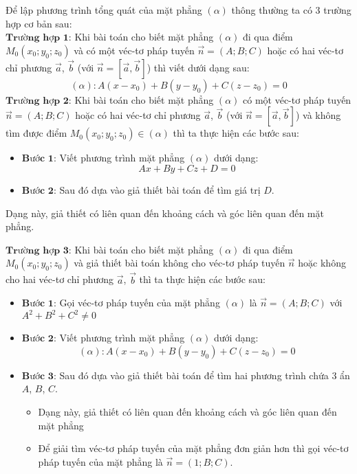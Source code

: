 Để lập phương trình tổng quát của mặt phẳng $\left(\alpha\right)$ thông thường ta có 3 trường hợp cơ bản sau:\\
$\textbf{Trường hợp 1:}$ Khi bài toán cho biết mặt phẳng $\left(\alpha\right)$ đi qua điểm $M_0 \left(x_0;y_0;z_0\right)$ và có một véc-tơ pháp tuyến $\overrightarrow{n} = \left(A;B;C\right)$ hoặc có hai véc-tơ chỉ phương $\overrightarrow{a}$, $\overrightarrow{b}$ (với $\overrightarrow{n} = \left[\overrightarrow{a},\overrightarrow{b}\right]$) thì viết dưới dạng sau:
$$\left(\alpha\right) \colon A\left(x-x_0\right)+B\left(y-y_0\right)+C\left(z-z_0\right)=0$$
$\textbf{Trường hợp 2:}$ Khi bài toán cho biết mặt phẳng $\left(\alpha\right)$ có một véc-tơ pháp tuyến $\overrightarrow{n} = \left(A;B;C\right)$ hoặc có hai véc-tơ chỉ phương $\overrightarrow{a}$, $\overrightarrow{b}$ (với $\overrightarrow{n} = \left[\overrightarrow{a},\overrightarrow{b}\right]$) và không tìm được điểm $M_0 \left(x_0;y_0;z_0\right) \in \left(\alpha\right)$ thì ta thực hiện các bước sau:
\begin{itemize}
\item $\textbf{Bước 1:}$ Viết phương trình mặt phẳng $\left(\alpha\right)$ dưới dạng:
$$Ax+By+Cz+D=0$$
\item $\textbf{Bước 2:}$ Sau đó dựa vào giả thiết bài toán để tìm giá trị $D$.
\end{itemize}
\begin{note}
Dạng này, giả thiết có liên quan đến khoảng cách và góc liên quan đến mặt phẳng.
\end{note}
$\textbf{Trường hợp 3:}$ Khi bài toán cho biết mặt phẳng $\left(\alpha\right)$ đi qua điểm $M_0 \left(x_0;y_0;z_0\right)$ và giả thiết bài toán không cho véc-tơ pháp tuyến $\overrightarrow{n}$ hoặc không cho hai véc-tơ chỉ phương $\overrightarrow{a}$, $\overrightarrow{b}$ thì ta thực hiện các bước sau:
\begin{itemize}
\item $\textbf{Bước 1:}$ Gọi véc-tơ pháp tuyến của mặt phẳng $\left(\alpha\right)$ là $\overrightarrow{n} = \left(A;B;C\right)$ với $A^2+B^2+C^2 \neq 0$
\item $\textbf{Bước 2:}$ Viết phương trình mặt phẳng $\left(\alpha\right)$ dưới dạng:
$$\left(\alpha\right) \colon A\left(x-x_0\right)+B\left(y-y_0\right)+C\left(z-z_0\right)=0$$
\item $\textbf{Bước 3:}$ Sau đó dựa vào giả thiết bài toán để tìm hai phương trình chứa $3$ ẩn $A$, $B$, $C$.
\begin{note}
\begin{itemize}
\item Dạng này, giả thiết có liên quan đến khoảng cách và góc liên quan đến mặt phẳng
\item Để giải tìm véc-tơ pháp tuyến của mặt phẳng đơn giản hơn thì gọi véc-tơ pháp tuyến của mặt phẳng là $\overrightarrow{n} = \left(1;B;C\right)$.
\end{itemize}
\end{note}
\end{itemize}

